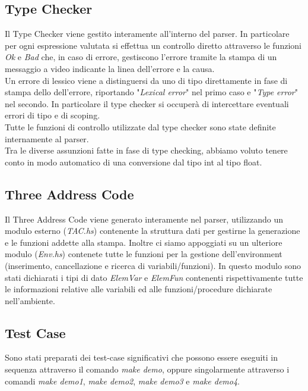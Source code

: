\documentclass[12pt]{article}
\begin{document}
\subsection{Type Checker}
Il Type Checker viene gestito interamente all'interno del parser. In particolare per ogni espressione valutata si effettua un controllo diretto attraverso le funzioni \textit{Ok} e \textit{Bad} che, in caso di errore, gestiscono l'errore tramite la stampa di un messaggio a video indicante la linea dell'errore e la causa.\\
Un errore di lessico viene a distinguersi da uno di tipo direttamente in fase di stampa dello dell'errore, riportando "\textit{Lexical error}" nel primo caso e "\textit{Type error}" nel secondo. In particolare il type checker si occuperà di intercettare eventuali errori di tipo e di scoping.\\
Tutte le funzioni di controllo utilizzate dal type checker sono state definite internamente al parser.\\
Tra le diverse assunzioni fatte in fase di type checking, abbiamo voluto tenere conto in modo automatico di una conversione dal tipo int al tipo float.

\subsection{Three Address Code}
Il Three Address Code viene generato interamente nel parser, utilizzando un modulo esterno (\textit{TAC.hs}) contenente la struttura dati per gestirne la generazione e le funzioni addette alla stampa. Inoltre ci siamo appoggiati su un ulteriore modulo (\textit{Env.hs}) contenete tutte le funzioni per la gestione dell'environment (inserimento, cancellazione e ricerca di variabili/funzioni).
In questo modulo sono stati dichiarati i tipi di dato \textit{ElemVar} e \textit{ElemFun} contenenti rispettivamente tutte le informazioni relative alle variabili ed alle funzioni/procedure dichiarate nell'ambiente.
\subsection{Test Case}
Sono stati preparati dei test-case significativi che possono essere eseguiti in sequenza attraverso il comando \textit{make demo}, oppure singolarmente attraverso i comandi \textit{make demo1}, \textit{make demo2}, \textit{make demo3} e \textit{make demo4}.
\end{document}
